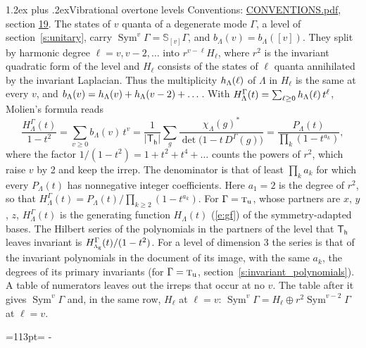 \documentclass[10pt,a4paper]{article}
\makeatletter
\renewcommand\section{\@startsection{section}{1}{\z@}{-3ex plus -1ex minus -.2ex}%
  {1.2ex plus .2ex}{\normalfont\large\sffamily\bfseries\color{parttitle}}}
\newcommand{\needspace}[1]{\par\penalty-100\begingroup\dimen0=#1\relax\dimen2=\pagegoal
  \advance\dimen2-\pagetotal\ifdim\dimen0>\dimen2\relax\ifdim\dimen2>0pt\vfil\break\fi\fi
  \endgroup}
\numberwithin{equation}{section}
\newcommand{\grp}[1]{\mathsf{#1}}
\newcommand{\irr}[1]{\text{\normalfont\scshape #1}}
\newcommand{\ptag}[1]{\mathrm{#1}}
\newcommand{\repD}[1]{D^{#1}}
\newcommand{\irchar}[1]{\chi_{#1}}
\newcommand{\conj}[1]{{#1}^{*}}
\newcommand{\schur}[1]{\mathbb{S}_{#1}}
\newcommand{\shape}[1]{[#1]}
\makeatother
\begin{document}
\section{Vibrational overtone levels}\label{s:overtones}
Conventions: \href{../../CONVENTIONS.pdf}{CONVENTIONS.pdf}, section \href{../../CONVENTIONS.pdf\#conv.19}{19}.
\leavevmode\label{n:index.quanta}\label{n:operator.symmetric.power}The states of $v$ quanta of a degenerate mode $\Gamma$, a level of section~\ref{s:unitary}, carry $\operatorname{Sym}^{v}\Gamma = \schur{\shape{v}}\Gamma$, and $b_\Lambda(v) = b_\Lambda(\shape{v})$. \label{n:local.quadratic.form}\label{n:set.harmonic}They split by harmonic degree $\ell = v, v - 2, \dots$ into $r^{v-\ell}H_\ell$, where $r^2$ is the invariant quadratic form of the level and $H_\ell$ consists of the states of $\ell$ quanta annihilated by the invariant Laplacian. \label{n:function.multiplicity.harmonic}Thus the multiplicity $\mathnormal{h}_\Lambda(\ell)$ of $\Lambda$ in $H_\ell$ is the same at every $v$, and $b_\Lambda(v) = \mathnormal{h}_\Lambda(v) + \mathnormal{h}_\Lambda(v - 2) + \dots$. \label{n:function.generating.level}With $H^{\Gamma}_\Lambda(t) = \sum_{\ell\ge0} \mathnormal{h}_\Lambda(\ell)\,t^{\ell}$, Molien's formula reads
\begin{equation}\label{e:molien}\frac{H^{\Gamma}_\Lambda(t)}{1 - t^2} = \sum_{v\ge0} b_\Lambda(v)\,t^v = \frac{1}{|\grp{T_{h}}|}\sum_{g}\frac{\conj{\irchar{\Lambda}(g)}}{\det\bigl(1 - t\,\repD{\Gamma}(g)\bigr)} = \frac{P_\Lambda(t)}{\prod_k (1-t^{a_k})},\end{equation}
where the factor $1/(1 - t^2) = 1 + t^2 + t^4 + \dots$ counts the powers of $r^2$, which raise $v$ by 2 and keep the irrep. The denominator is that of least $\prod_k a_k$ for which every $P_\Lambda(t)$ has nonnegative integer coefficients. Here $a_1 = 2$ is the degree of $r^2$, so that $H^{\Gamma}_\Lambda(t) = P_\Lambda(t)/\prod_{k\ge2}(1 - t^{a_k})$. For $\Gamma = \irr{t}_{\ptag{u}}$, whose partners are $x$, $y$, $z$, $H^{\Gamma}_\Lambda(t)$ is the generating function $H_\Lambda(t)$ (\ref{e:gf}) of the symmetry-adapted bases. The Hilbert series of the polynomials in the partners of the level that $\grp{T_{h}}$ leaves invariant is $H^{\Gamma}_{\irr{a}_{\ptag{g}}}(t)/(1 - t^2)$. For a level of dimension 3 the series is that of the invariant polynomials in the document of its image, with the same $a_k$, the degrees of its primary invariants (for $\Gamma = \irr{t}_{\ptag{u}}$, section~\ref{s:invariant_polynomials}). A table of numerators leaves out the irreps that occur at no $v$. The table after it gives $\operatorname{Sym}^{v}\Gamma$ and, in the same row, $H_\ell$ at $\ell = v$: $\operatorname{Sym}^{v}\Gamma = H_\ell \oplus r^2\operatorname{Sym}^{v-2}\Gamma$ at $\ell = v$.
\needspace{113pt}
\end{document}
